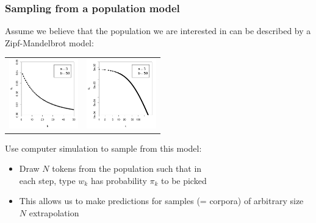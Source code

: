 \documentclass[t]{beamer} %
\begin{document}
\begin{frame}
  \frametitle{Sampling from a population model}

  Assume we believe that the population we are interested in can be described
  by a Zipf-Mandelbrot model: %
  \begin{center}
    \begin{tabular}{cc}
      \includegraphics[width=30mm]{img/05-samples-zm-model} &
      \includegraphics[width=30mm]{img/05-samples-zm-model-log} 
    \end{tabular}
  \end{center}
  
  Use computer simulation to sample from this model:
  \begin{itemize}
  \item Draw $N$ tokens from the population such that in\\
    each step, type $w_k$ has probability $\pi_k$ to be picked
  \item This allows us to make predictions for samples (= corpora) of
    arbitrary size $N$ \so extrapolation
  \end{itemize}
\end{frame}
\end{document}
